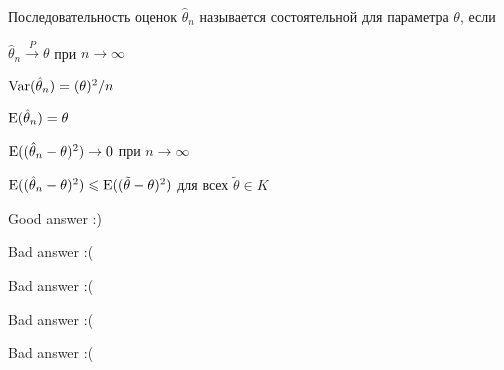 
\begin{question}
Последовательность оценок \(\hat \theta_n\) называется состоятельной для
параметра \(\theta\), если
\begin{answerlist}
  \item \(\hat \theta_n \stackrel{P}{\to} \theta\) при
\(n\stackrel{}{\to} \infty\)
  \item \(\operatorname{Var}(\hat \theta_n)=(\theta)^2/n\)
  \item \(\operatorname{E}(\hat \theta_n)=\theta\)
  \item \(\operatorname{E}((\hat \theta_n - \theta)^2) \stackrel{}{\to} 0\) при
\(n\stackrel{}{\to} \infty\)
  \item \(\operatorname{E}((\hat \theta_n - \theta)^2) \leqslant \operatorname{E}((\tilde \theta - \theta)^2)\)
для всех \(\tilde \theta \in K\)
\end{answerlist}
\end{question}

\begin{solution}
\begin{answerlist}
  \item Good answer :)
  \item Bad answer :(
  \item Bad answer :(
  \item Bad answer :(
  \item Bad answer :(
\end{answerlist}
\end{solution}

